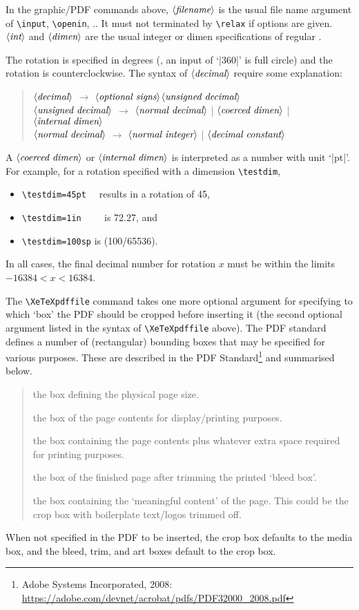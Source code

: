 \documentclass[12pt]{article}
\makeatletter
\newcommand\tex    {\hologo{TeX}\xspace}
\edef\|{|}
\newcommand\xarg[1]{$\langle\hbox{\rmfamily\itshape #1}\rangle$}
\def\<#1>{\xarg{#1}}
\def\cs#1{\texttt{\textbackslash#1}}
\let\latin\relax %
\def\ie{\latin{i.e.}}
\def\etc{\@ifnextchar.{\latin{etc}}{\latin{etc.}\@}}
\makeatother
\begin{document}
\noindent In the graphic/PDF commands above, \xarg{filename} is the
usual file name argument of \cs{input}, \cs{openin}, \etc.  It must not
terminated by \cs{relax} if options are given.  \xarg{int} and
\xarg{dimen} are the usual integer or dimen specifications of regular
\tex.

The rotation is specified in degrees (\ie, an input of ‘|360|’ is full
circle) and the rotation is counterclockwise. The syntax of
\xarg{decimal} require some explanation:
\begin{quote}
\<decimal> $\to$ \<optional signs>\<unsigned decimal>\\
\<unsigned decimal> $\to$ \<normal decimal>
  \| \<coerced dimen> \| \<internal dimen>\\
\<normal decimal> $\to$ \<normal integer> \| \<decimal constant>
\end{quote}
A \xarg{coerced dimen} or \xarg{internal dimen} is interpreted as a number
with unit ‘|pt|’. For example, for a rotation specified with a dimension
\cs{testdim},
\begin{itemize}
\item \verb|\testdim=45pt  | results in a rotation of 45\textdegree,
\item \verb|\testdim=1in    | is 72.27\textdegree, and
\item \verb|\testdim=100sp| is (100/65536)\textdegree.
\end{itemize}
In all cases, the final decimal number for rotation $x$ must be
within the limits $-16384 < x < 16384$.

The \cs{XeTeXpdffile} command takes one more optional argument for
specifying to which ‘box’ the PDF should be cropped before inserting
it (the second optional argument listed in the syntax of
\cs{XeTeXpdffile} above). The PDF standard defines a number of
(rectangular) bounding boxes that may be specified for various
purposes. These are described in the PDF Standard\footnote{Adobe
Systems Incorporated, 2008:\\
\url{https://adobe.com/devnet/acrobat/pdfs/PDF32000_2008.pdf}} and
summarised below.
\begin{quote}
\begin{description}[style=nextline,leftmargin=1.5cm]
\item [media] the box defining the physical page size.
\item [crop] the box of the page contents for display/printing purposes.
\item [bleed] the box containing the page contents plus whatever extra
space required for printing purposes.
\item [trim] the box of the finished page after trimming the printed
‘bleed box’.
\item [art] the box containing the ‘meaningful content’ of the
page. This could be the crop box with boilerplate text/logos trimmed
off.
\end{description}
\end{quote}
When not specified in the PDF to be inserted, the crop box defaults
to the media box, and the bleed, trim, and art boxes default to the crop
box.
\end{document}
